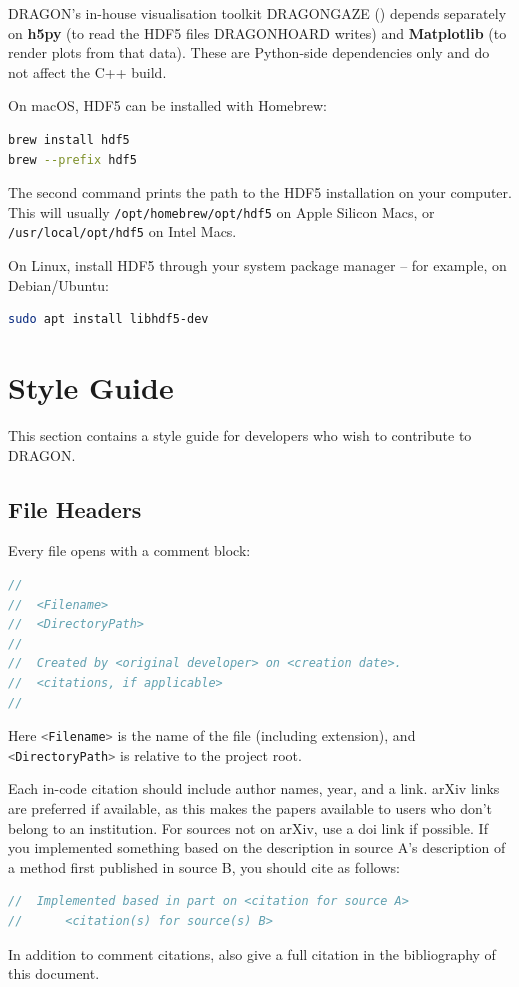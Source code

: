 \documentclass[11pt]{report}
\newcommand{\bash}[1]{\lstinline[language=bash]{#1}}
\begin{document}
DRAGON's in-house visualisation toolkit DRAGONGAZE () depends separately on \textbf{h5py} (to read the HDF5 files DRAGONHOARD writes) and \textbf{Matplotlib} (to render plots from that data). These are Python-side dependencies only and do not affect the C++ build.


On macOS, HDF5 can be installed with Homebrew:
\begin{lstlisting}[language=bash]
brew install hdf5
brew --prefix hdf5
\end{lstlisting}
The second command prints the path to the HDF5 installation on your computer. This will usually \bash{/opt/homebrew/opt/hdf5} on Apple Silicon Macs, or \bash{/usr/local/opt/hdf5} on Intel Macs.



On Linux, install HDF5 through your system package manager -- for example, on Debian/Ubuntu:
\begin{lstlisting}[language=bash]
sudo apt install libhdf5-dev
\end{lstlisting}


\section{Style Guide}

This section contains a style guide for developers who wish to contribute to DRAGON.

\subsection{File Headers}

Every file opens with a comment block:
\begin{lstlisting}[language=C++]
//
//  <Filename>
//  <DirectoryPath>
//
//  Created by <original developer> on <creation date>.
//  <citations, if applicable>
//
\end{lstlisting}
Here \bash{<Filename>} is the name of the file (including extension), and \bash{<DirectoryPath>} is relative to the project root.

Each in-code citation should include author names, year, and a link. arXiv links  are preferred if available, as this makes the papers available to users who don't belong to an institution. For sources not on arXiv, use a doi link if possible. 
If you implemented something based on the description in source A's description of a method first published in source B, you should cite as follows:
\begin{lstlisting}[language=C++]
//  Implemented based in part on <citation for source A>
//      <citation(s) for source(s) B>
\end{lstlisting}
In addition to comment citations, also give a full citation in the bibliography of this document.
\end{document}
